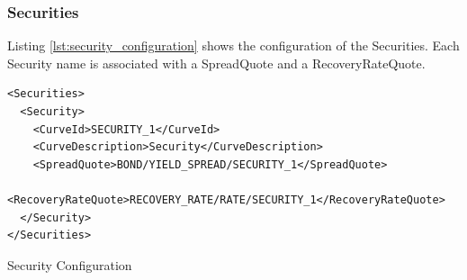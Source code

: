 \documentclass[12pt, a4paper]{article}
\newenvironment{longlisting}{\captionsetup{type=listing}}{}
\begin{document}
\subsubsection{Securities}

Listing \ref{lst:security_configuration} shows the configuration of the Securities. Each Security name is associated with
a SpreadQuote and a RecoveryRateQuote.

\begin{longlisting}
\begin{verbatim}
<Securities>
  <Security>
    <CurveId>SECURITY_1</CurveId>
    <CurveDescription>Security</CurveDescription>
    <SpreadQuote>BOND/YIELD_SPREAD/SECURITY_1</SpreadQuote>
    <RecoveryRateQuote>RECOVERY_RATE/RATE/SECURITY_1</RecoveryRateQuote>
  </Security>
</Securities>
\end{verbatim}
\caption{Security Configuration}
\label{lst:security_configuration}
\end{longlisting}









\end{document}
